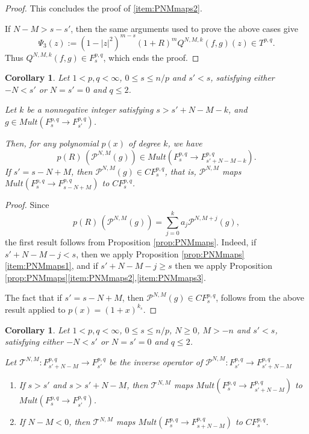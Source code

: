 \documentclass[12pt,twoside,leqno,final]{amsart}
\theoremstyle{plain}
\newtheorem{cor}[thm]{Corollary}
\begin{document}
\begin{proof}
This concludes the proof of \eqref{item:PNMmaps2}.

If $N-M>s-s'$, then the same arguments used to prove the above cases give 
\begin{equation*}
\Psi_3(z):=(1-|z|^2)^{m-s}(1+R)^m  Q^{N,M,k}(f,g)(z)\in T^{p,q}.
\end{equation*}
Thus $Q^{N,M,k}(f,g)\in F^{p,q}_{s}$, which ends the proof. 
\end{proof}

\begin{cor}\label{cor:PNMMulttoCF}
Let $1< p,q<\infty$, $0\le s\le n/p$  
and $s'<  s$, satisfying either 
$-N<s'$ or $N=s'=0$ and $q\le 2$.

Let $k$ be a nonnegative integer satisfying $s>s'+N-M-k$, 
and $g\in Mult(F^{p,q}_s\to F^{p,q}_{s'})$.

Then, for any polynomial $p(x)$ of degree $k$, we have
$$
p(R)\,( {{\mathcal P}}^{N,M}(g))\in Mult(F^{p,q}_s\to F^{p,q}_{s'+N-M-k}).
$$
If $s'=s-N+M$, then ${{\mathcal P}}^{N,M}(g)\in CF^{p,q}_s$, that is, ${{\mathcal P}}^{N,M}$ maps 
$Mult(F^{p,q}_s\to F^{p,q}_{s-N+M})$ to $CF^{p,q}_s$.
\end{cor}

\begin{proof}
Since 
$$
p(R)\,({{\mathcal P}}^{N,M}(g))=\sum_{j=0}^k a_j {{\mathcal P}}^{N,M+j}(g),
$$
the first result follows from Proposition \ref{prop:PNMmaps}. 
Indeed, if $s'+N-M-j<s$, then we apply Proposition \ref{prop:PNMmaps}\eqref{item:PNMmaps1}, and if $s'+N-M-j\ge s$ then we apply Proposition \ref{prop:PNMmaps}\eqref{item:PNMmaps2},\eqref{item:PNMmaps3}.

The fact that if $s'=s-N+M$, then ${{\mathcal P}}^{N,M}(g)\in CF^{p,q}_s$, follows from the above result applied to $p(x)=(1+x)^{k_s}$. 
\end{proof}

\begin{cor} \label{cor:TNMmaps}
Let $1< p,q<\infty$, $0\le s\le n/p$, $N\ge 0$, $M>-n$ and $s'<  s$, satisfying either 
$-N<s'$ or $N=s'=0$ and $q\le 2$.

Let ${{\mathcal T}}^{N,M}:F^{p,q}_{s'+N-M}\to F^{p,q}_{s'}$ be  the  inverse operator 
of ${{\mathcal P}}^{N,M}:F^{p,q}_{s'}\to F^{p,q}_{s'+N-M}$ 

\begin{enumerate}
	\item \label{item:TNMmaps1} If $s>s'$ and $s>s'+N-M$, then ${{\mathcal T}}^{N,M}$ maps 
$Mult(F^{p,q}_s\to F^{p,q}_{s'+N-M})$ to $Mult(F^{p,q}_s\to F^{p,q}_{s'})$.

	\item \label{item:TNMmaps2} If $N-M<0$, then ${{\mathcal T}}^{N,M}$ maps $Mult(F^{p,q}_s\to F^{p,q}_{s+N-M})$ to $CF^{p,q}_s$. 
\end{enumerate}
\end{cor}
\end{document}
